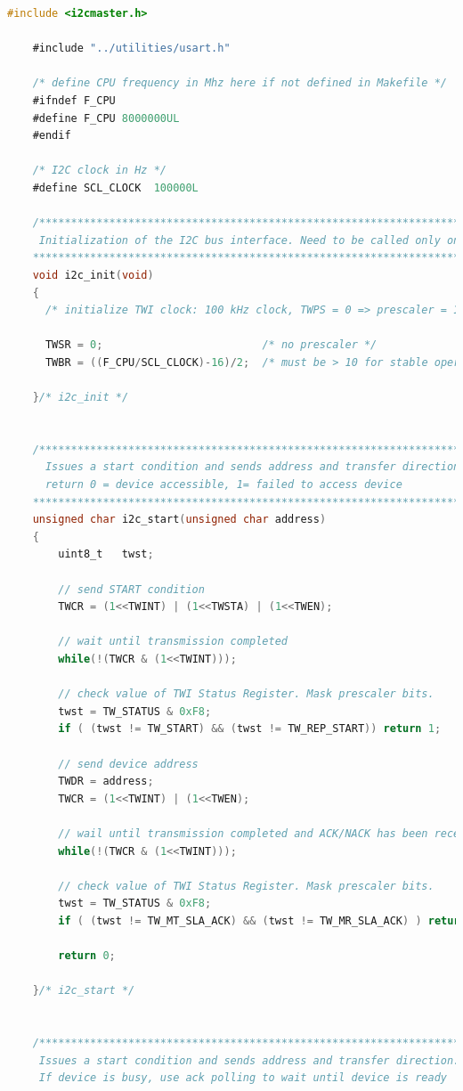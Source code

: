 \documentclass{article}
\numberwithin{figure}{section}
\numberwithin{equation}{section}
\begin{document}
{\begin{lstlisting}[language=C,label=lst:twimaster.c,caption=twimaster.c]
    #include <i2cmaster.h>

    #include "../utilities/usart.h"

    /* define CPU frequency in Mhz here if not defined in Makefile */
    #ifndef F_CPU
    #define F_CPU 8000000UL
    #endif

    /* I2C clock in Hz */
    #define SCL_CLOCK  100000L

    /*************************************************************************
     Initialization of the I2C bus interface. Need to be called only once
    *************************************************************************/
    void i2c_init(void)
    {
      /* initialize TWI clock: 100 kHz clock, TWPS = 0 => prescaler = 1 */

      TWSR = 0;                         /* no prescaler */
      TWBR = ((F_CPU/SCL_CLOCK)-16)/2;  /* must be > 10 for stable operation */

    }/* i2c_init */


    /*************************************************************************
      Issues a start condition and sends address and transfer direction.
      return 0 = device accessible, 1= failed to access device
    *************************************************************************/
    unsigned char i2c_start(unsigned char address)
    {
        uint8_t   twst;

    	// send START condition
    	TWCR = (1<<TWINT) | (1<<TWSTA) | (1<<TWEN);

    	// wait until transmission completed
    	while(!(TWCR & (1<<TWINT)));

    	// check value of TWI Status Register. Mask prescaler bits.
    	twst = TW_STATUS & 0xF8;
    	if ( (twst != TW_START) && (twst != TW_REP_START)) return 1;

    	// send device address
    	TWDR = address;
    	TWCR = (1<<TWINT) | (1<<TWEN);

    	// wail until transmission completed and ACK/NACK has been received
    	while(!(TWCR & (1<<TWINT)));

    	// check value of TWI Status Register. Mask prescaler bits.
    	twst = TW_STATUS & 0xF8;
    	if ( (twst != TW_MT_SLA_ACK) && (twst != TW_MR_SLA_ACK) ) return 1;

    	return 0;

    }/* i2c_start */


    /*************************************************************************
     Issues a start condition and sends address and transfer direction.
     If device is busy, use ack polling to wait until device is ready


\end{lstlisting}}
\end{document}
